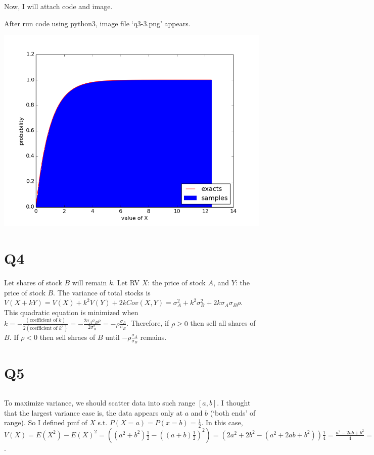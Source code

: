 \documentclass{article}
\begin{document}
Now, I will attach code and image.



After run code using python3, image file `q3-3.png' appears.

\includegraphics{./q3-3.png}

\section{Q4}
Let shares of stock $B$ will remain $k$.
Let RV $X$: the price of stock $A$, and $Y$: the price of stock $B$.
The variance of total stocks is
$V(X+kY) = V(X) + k^2V(Y) + 2kCov(X,Y)
= \sigma_A^2 + k^2\sigma_B^2 + 2k\sigma_A\sigma_B\rho$.
This quadratic equation is minimized when
$k=-\frac{(\text{coefficient of }k)}{2(\text{coefficient of }k^2)}
=-\frac{2\sigma_A\sigma_B\rho}{2\sigma_B^2}
=-\rho\frac{\sigma_A}{\sigma_B}$.
Therefore, if $\rho \geq 0$ then sell all shares of $B$.
If $\rho < 0$ then sell shraes of $B$ until $-\rho\frac{\sigma_A}{\sigma_B}$ remains.

\section{Q5}

\subsection{}
To maximize variance, we should scatter data into such range $[a,b]$.
I thought that the largest variance case is, the data appears only at $a$ and $b$ (`both ends' of range).
So I defined pmf of $X$ s.t. $P(X=a)=P(x=b)=\frac{1}{2}$.
In this case,
$V(X) = E(X^2) - E(X)^2
= ((a^2 + b^2)\frac{1}{2} - ((a+b)\frac{1}{2})^2)
= (2a^2+2b^2-(a^2+2ab+b^2))\frac{1}{4}
= \frac{a^2-2ab+b^2}{4}
= \frac{(a-b)^2}{4}$. \\
\end{document}
